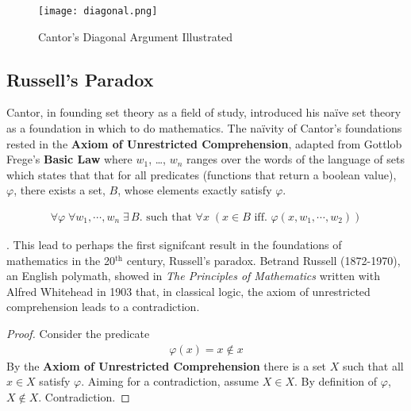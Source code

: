 \begin{figure}[h]
    \texttt{[image: diagonal.png]}
    \centering
    \caption{Cantor's Diagonal Argument Illustrated }
    \label{fig:diagonal}
\end{figure}

\subsection{Russell's Paradox}
Cantor, in founding set theory as a field of study, introduced his na{\"i}ve set
theory \cite{Cantor:1874} as a foundation in which to do mathematics. The
na{\"i}vity of Cantor's foundations rested in the \textbf{Axiom of Unrestricted
Comprehension}, adapted from Gottlob Frege's \textbf{Basic Law }
\cite{frege1884grundlagen} where $w_{1}$, \ldots , $w_{n}$ ranges over the words
of the language of sets which states that that for all predicates (functions
that return a boolean value), $\varphi$, there exists a set, $B$, whose elements
exactly satisfy $\varphi$.

\begin{definition}
    {\large
    \begin{align*}
        \forall \varphi \; \forall w_{1}, \cdots , w_{n} \; \exists \, B.  \textrm{ such that }
        \forall x  \; (x \in B \textrm{ iff. }  \varphi(x, w_{1},\cdots,w_{2} ))
    \end{align*}
    }%
\end{definition}

. This lead to perhaps the first signifcant result in the foundations of
mathematics in the 20$^{\textrm{th}}$ century, Russell's paradox. Betrand Russell (1872-1970),
an English polymath, showed in \textit{The Principles of Mathematics}
\cite{russell1903principles} written with Alfred Whitehead in 1903 that, in
classical logic, the axiom of unrestricted comprehension leads to a
contradiction.

\begin{theorem}
\end{theorem}

\begin{proof}
    Consider the predicate
    \begin{align*}
        \varphi(x) = x \not\in x
    \end{align*}
    By the \textbf{Axiom of Unrestricted Comprehension} there is a set $X$ such
    that all $x \in X$ satisfy $\varphi$. Aiming for a contradiction, assume
    $X \in X$. By definition of $\varphi$, $X \not\in X$. Contradiction.
\end{proof}

